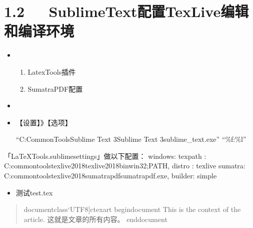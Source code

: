 \documentclass[letterpaper,12pt,english]{sphinxmanual}
\begin{document}
\section{1.2   SublimeText配置TexLive编辑和编译环境}
\label{\detokenize{001software/001install/LaTex:sublimetexttexlive}}\begin{itemize}
\item {} 
\begin{enumerate}
%
\item {} 
LatexTools插件

\item {} 
SumatraPDF配置

\end{enumerate}

\item {} 

\item {} 
【设置】\sphinxhyphen{}》【选项】

“C:CommonToolsSublime Text 3Sublime Text 3sublime\_text.exe” “\%f:\%l”

\end{itemize}

\begin{sphinxVerbatim}[commandchars=\\\{\}]
「LaTeXTools.sublime\PYGZhy{}settings」做以下配置：
\PYGZdq{}windows\PYGZdq{}:\PYGZob{}
    \PYGZdq{}texpath\PYGZdq{} : \PYGZdq{}C:\PYGZbs{}\PYGZbs{}commontools\PYGZbs{}\PYGZbs{}texlive2018\PYGZbs{}\PYGZbs{}texlive\PYGZbs{}\PYGZbs{}2018\PYGZbs{}\PYGZbs{}bin\PYGZbs{}\PYGZbs{}win32;\PYGZdl{}PATH\PYGZdq{},
\PYGZdq{}distro\PYGZdq{} : \PYGZdq{}texlive\PYGZdq{}
\PYGZdq{}sumatra\PYGZdq{}: \PYGZdq{}C:\PYGZbs{}\PYGZbs{}commontools\PYGZbs{}\PYGZbs{}texlive2018\PYGZbs{}\PYGZbs{}sumatrapdf\PYGZbs{}\PYGZbs{}sumatrapdf.exe\PYGZdq{},
\PYGZcb{}
    \PYGZdq{}builder\PYGZdq{}: \PYGZdq{}simple\PYGZdq{}
\PYGZcb{}
\end{sphinxVerbatim}
\begin{itemize}
\item {} 
测试test.tex

\end{itemize}
\begin{quote}

\begin{sphinxVerbatim}[commandchars=\\\{\}]
\PYGZbs{}documentclass`UTF8]\PYGZob{}ctexart\PYGZcb{}
\PYGZbs{}begin\PYGZob{}document\PYGZcb{}
This is the context of the article.
这就是文章的所有内容。
\PYGZbs{}end\PYGZob{}document\PYGZcb{}
\end{sphinxVerbatim}
\end{quote}
\end{document}
